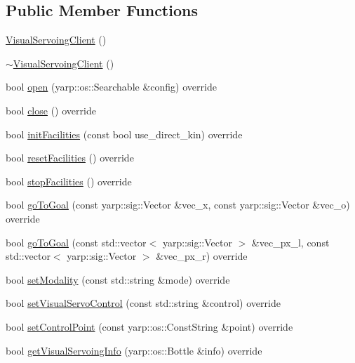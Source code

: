 \subsection*{Public Member Functions}
\begin{DoxyCompactItemize}
\item 
\hyperlink{classVisualServoingClient_a8656f6464b80d6a5815232c90bb0f9f7}{Visual\+Servoing\+Client} ()
\item 
\hyperlink{classVisualServoingClient_ab9d97c68e33a3d3aa5bad80921efd45a}{$\sim$\+Visual\+Servoing\+Client} ()
\item 
bool \hyperlink{classVisualServoingClient_ad898a60edcd6dae0b2083db81bf08962}{open} (yarp\+::os\+::\+Searchable \&config) override
\item 
bool \hyperlink{classVisualServoingClient_ac6f08779b3efcb1d5a1b7dc1720c1d6c}{close} () override
\item 
bool \hyperlink{classVisualServoingClient_ae6a66fcc21b354cef0aba9ca6a6192fb}{init\+Facilities} (const bool use\+\_\+direct\+\_\+kin) override
\item 
bool \hyperlink{classVisualServoingClient_a9e0fe7d6cb6cee09c0fb9ed3903a66be}{reset\+Facilities} () override
\item 
bool \hyperlink{classVisualServoingClient_a6086c261684ff994d4daf31a1a7ffd0f}{stop\+Facilities} () override
\item 
bool \hyperlink{classVisualServoingClient_aa83b1b0be446896611b7c7675d716905}{go\+To\+Goal} (const yarp\+::sig\+::\+Vector \&vec\+\_\+x, const yarp\+::sig\+::\+Vector \&vec\+\_\+o) override
\item 
bool \hyperlink{classVisualServoingClient_a986e0195e3e855f9c613af0bcd43e6e2}{go\+To\+Goal} (const std\+::vector$<$ yarp\+::sig\+::\+Vector $>$ \&vec\+\_\+px\+\_\+l, const std\+::vector$<$ yarp\+::sig\+::\+Vector $>$ \&vec\+\_\+px\+\_\+r) override
\item 
bool \hyperlink{classVisualServoingClient_a4b8e26dc7c8afa9b343947894ff214aa}{set\+Modality} (const std\+::string \&mode) override
\item 
bool \hyperlink{classVisualServoingClient_a056ec60c6b8a144708d8aeda34344111}{set\+Visual\+Servo\+Control} (const std\+::string \&control) override
\item 
bool \hyperlink{classVisualServoingClient_ae9ea048d67f2a92b9be08d737e6622a3}{set\+Control\+Point} (const yarp\+::os\+::\+Const\+String \&point) override
\item 
bool \hyperlink{classVisualServoingClient_a4c416452594f40ef8c752b77b79c136f}{get\+Visual\+Servoing\+Info} (yarp\+::os\+::\+Bottle \&info) override

\end{DoxyCompactItemize}
